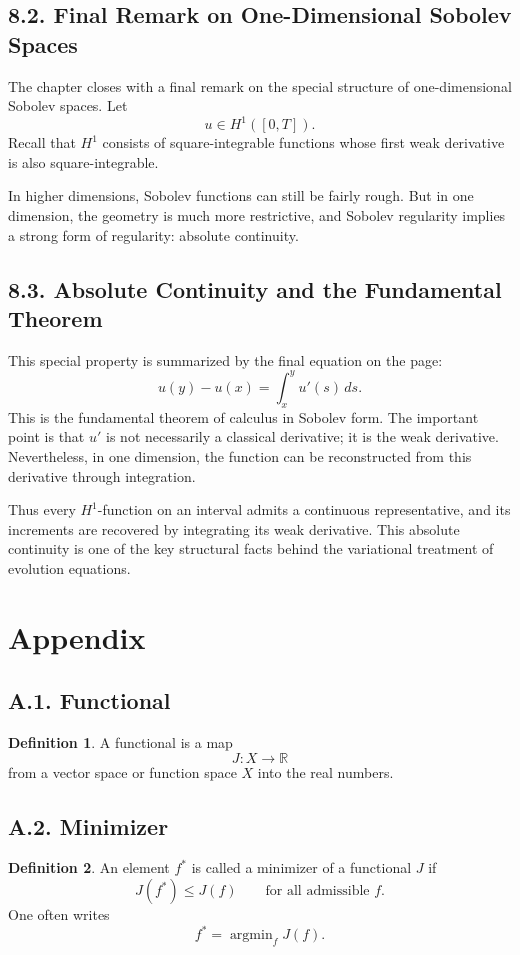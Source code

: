 \documentclass[11pt]{article}
\theoremstyle{definition}
\newtheorem{definition}{Definition}
\theoremstyle{remark}
\DeclareMathOperator{\argmin}{argmin}
\begin{document}
\subsection*{8.2. Final Remark on One-Dimensional Sobolev Spaces}
The chapter closes with a final remark on the special structure of one-dimensional Sobolev spaces. Let
\[
u\in H^1([0,T]).
\]
Recall that \(H^1\) consists of square-integrable functions whose first weak derivative is also square-integrable.

In higher dimensions, Sobolev functions can still be fairly rough. But in one dimension, the geometry is much more restrictive, and Sobolev regularity implies a strong form of regularity: absolute continuity.

\subsection*{8.3. Absolute Continuity and the Fundamental Theorem}
This special property is summarized by the final equation on the page:
\[
u(y)-u(x)=\int_x^y u'(s)\,ds.
\]
This is the fundamental theorem of calculus in Sobolev form. The important point is that \(u'\) is not necessarily a classical derivative; it is the weak derivative. Nevertheless, in one dimension, the function can be reconstructed from this derivative through integration.

Thus every \(H^1\)-function on an interval admits a continuous representative, and its increments are recovered by integrating its weak derivative. This absolute continuity is one of the key structural facts behind the variational treatment of evolution equations.

\section*{Appendix}

\subsection*{A.1. Functional}
\begin{definition}
A functional is a map
\[
J:X\to \mathbb R
\]
from a vector space or function space \(X\) into the real numbers.
\end{definition}

\subsection*{A.2. Minimizer}
\begin{definition}
An element \(f^*\) is called a minimizer of a functional \(J\) if
\[
J(f^*)\le J(f)
\qquad
\text{for all admissible } f.
\]
One often writes
\[
f^*=\argmin_f J(f).
\]
\end{definition}
\end{document}
